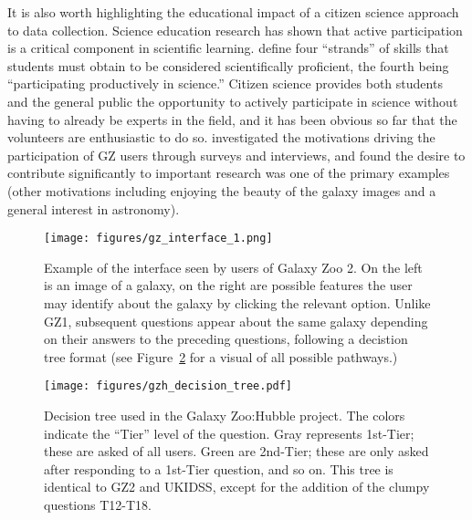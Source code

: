 It is also worth highlighting the educational impact of a citizen science approach to data collection. Science education research has shown that active participation is a critical component in scientific learning. \citet{Michaels2008} define four ``strands'' of skills that students must obtain to be considered scientifically proficient, the fourth being ``participating productively in science.'' Citizen science provides both students and the general public the opportunity to actively participate in science without having to already be experts in the field, and it has been obvious so far that the volunteers are enthusiastic to do so. \citet{Raddick2010} investigated the motivations driving the participation of GZ users through surveys and interviews, and found the desire to contribute significantly to important research was one of the primary examples (other motivations including enjoying the beauty of the galaxy images and a general interest in astronomy). 


\begin{figure}
\centering
\texttt{[image: figures/gz\_interface\_1.png]}
\caption{Example of the interface seen by users of Galaxy Zoo 2. On the left is an image of a galaxy, on the right are possible features the user may identify about the galaxy by clicking the relevant option. Unlike GZ1, subsequent questions appear about the same galaxy depending on their answers to the preceding questions, following a decistion tree format (see Figure~\ref{fig:decisiontree} for a visual of all possible pathways.)}
\label{fig:gz2_interface}
\end{figure}

\begin{figure}
\centering
\texttt{[image: figures/gzh\_decision\_tree.pdf]}
\label{fig:decisiontree}
\caption{Decision tree used in the Galaxy Zoo:Hubble project. The colors indicate the ``Tier'' level of the question. Gray represents 1st-Tier; these are asked of all users. Green are 2nd-Tier; these are only asked after responding to a 1st-Tier question, and so on. This tree is identical to GZ2 and UKIDSS, except for the addition of the clumpy questions T12-T18.}
\end{figure}

